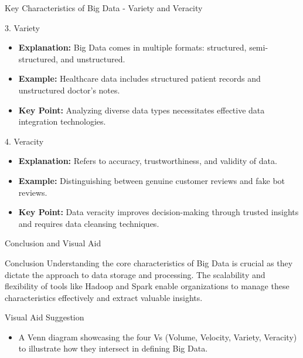 \documentclass[aspectratio=169]{beamer}
\begin{document}
\begin{frame}[fragile]{Key Characteristics of Big Data - Variety and Veracity}
    \begin{block}{3. Variety}
        \begin{itemize}
            \item \textbf{Explanation:} Big Data comes in multiple formats: structured, semi-structured, and unstructured.
            \item \textbf{Example:} Healthcare data includes structured patient records and unstructured doctor's notes.
            \item \textbf{Key Point:} Analyzing diverse data types necessitates effective data integration technologies.
        \end{itemize}
    \end{block}

    \begin{block}{4. Veracity}
        \begin{itemize}
            \item \textbf{Explanation:} Refers to accuracy, trustworthiness, and validity of data.
            \item \textbf{Example:} Distinguishing between genuine customer reviews and fake bot reviews.
            \item \textbf{Key Point:} Data veracity improves decision-making through trusted insights and requires data cleansing techniques.
        \end{itemize}
    \end{block}
\end{frame}

\begin{frame}[fragile]{Conclusion and Visual Aid}
    \begin{block}{Conclusion}
        Understanding the core characteristics of Big Data is crucial as they dictate the approach to data storage and processing. The scalability and flexibility of tools like Hadoop and Spark enable organizations to manage these characteristics effectively and extract valuable insights.
    \end{block}
    
    \begin{block}{Visual Aid Suggestion}
        \begin{itemize}
            \item A Venn diagram showcasing the four Vs (Volume, Velocity, Variety, Veracity) to illustrate how they intersect in defining Big Data.
        \end{itemize}
    \end{block}
\end{frame}
\end{document}
